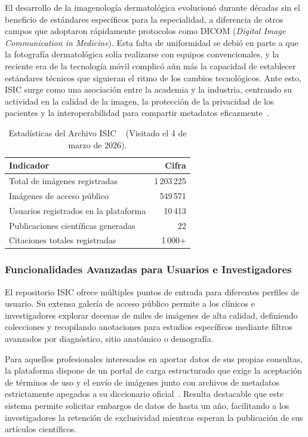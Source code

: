 El desarrollo de la imagenología dermatológica evolucionó durante décadas sin el beneficio de estándares 
específicos para la especialidad, a diferencia de otros campos que adoptaron rápidamente protocolos como 
DICOM (\textit{Digital Image Communication in Medicine}). Esta falta de uniformidad se debió en parte a que 
la fotografía dermatológica solía realizarse con equipos convencionales, y la reciente era de la tecnología 
móvil complicó aún más la capacidad de establecer estándares técnicos que siguieran el ritmo de los cambios 
tecnológicos. Ante esto, ISIC surge como una asociación entre la academia y la industria, 
centrando su actividad en la calidad de la imagen, la protección de la privacidad de los pacientes y la 
interoperabilidad para compartir metadatos eficazmente~\cite{isic_mission}.

\begin{table}[htbp]
\centering
\caption{Estadísticas del Archivo ISIC ~\cite{isic_home} (Visitado el 4 de marzo de 2026).}\label{tab:isic-stats}
\begin{tabular}{lr}
\toprule
\textbf{Indicador} & \textbf{Cifra} \\
\midrule
Total de imágenes registradas & 1\,203\,225 \\
Imágenes de acceso público & 549\,571 \\
Usuarios registrados en la plataforma & 10\,413 \\
Publicaciones científicas generadas & 22 \\
Citaciones totales registradas & 1\,000+ \\
\bottomrule
\end{tabular}
\end{table}

\subsubsection{Funcionalidades Avanzadas para Usuarios e Investigadores}

El repositorio ISIC ofrece múltiples puntos de entrada para diferentes perfiles de usuario. 
Su extensa galería de acceso público permite a los clínicos e investigadores explorar decenas de miles de 
imágenes de alta calidad, definiendo colecciones y recopilando anotaciones para estudios específicos mediante 
filtros avanzados por diagnóstico, sitio anatómico o demografía. 

Para aquellos profesionales interesados en aportar datos de sus propias consultas, la plataforma dispone de un 
portal de carga estructurado que exige la aceptación de términos de uso y el envío de imágenes junto con 
archivos de metadatos estrictamente apegados a su diccionario oficial~\cite{isic_archive_contribute}. Resulta 
destacable que este sistema permite solicitar embargos de datos de hasta un año, facilitando a los 
investigadores la retención de exclusividad mientras esperan la publicación de sus artículos científicos.

